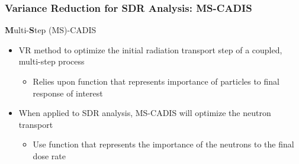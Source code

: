 \documentclass{beamer}
\begin{document}
\begin{frame}
\frametitle{Variance Reduction for SDR Analysis: MS-CADIS}
	\begin{block}{\textbf{M}ulti-\textbf{S}tep (MS)-CADIS}
  \begin{itemize}
  \item {VR method to optimize the initial radiation transport step of a
	  coupled, multi-step process}
		  \begin{itemize}
			  \item{Relies upon function that represents importance
				  of particles to final response of
				  interest}
		  \end{itemize}
  \item{When applied to SDR analysis, MS-CADIS will optimize the neutron transport}
    \begin{itemize}
    \item{Use function that represents the   importance of the neutrons to
	    the final dose rate}
    \end{itemize}
  \end{itemize}
\end{block}
%
\end{frame}

%
		
\end{document}
